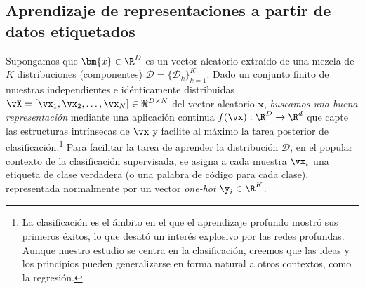 \documentclass[../../book-main.tex]{subfiles}
\begin{document}
\subsection{Aprendizaje de representaciones a partir de datos etiquetados}

Supongamos que $\bm{x} \in \R^D$ es un vector aleatorio extraído de
una mezcla de $K$ distribuciones (componentes)  $\mathcal{D} =
\{\mathcal{D}_k\}_{k=1}^K$. Dado un conjunto finito de muestras independientes e idénticamente distribuidas $\vX =
[\vx_1, \vx_2, \ldots, \vx_N] \in \Re^{D\times N}$ del vector aleatorio
$\bm x$, {\em buscamos una buena representación}
mediante una aplicación continua $f(\vx): \R^D \rightarrow \R^d$ que capte
las estructuras intrínsecas de $\vx$ y facilite al máximo la tarea posterior
de clasificación.\footnote{La clasificación es el ámbito en el que el
    aprendizaje profundo mostró sus primeros éxitos, lo que desató un
    interés explosivo por las redes profundas. Aunque nuestro estudio se centra en
    la clasificación, creemos que las ideas y los principios pueden
generalizarse en forma natural a otros contextos, como la regresión.} Para facilitar la tarea
de aprender la distribución $\mathcal{D}$, en el popular contexto de la
clasificación supervisada, se asigna a cada muestra $\vx_i$ una etiqueta de clase verdadera (o una palabra de código para cada
clase), representada normalmente por un vector \textit{one-hot} $\y_i \in \R^K$.
\end{document}
